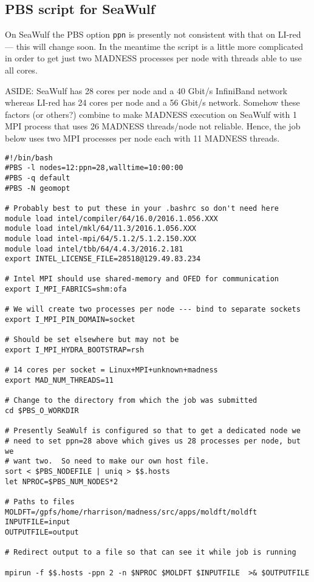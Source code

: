 \documentclass[letterpaper]{book}
\begin{document}
\subsection{PBS script for SeaWulf}

On SeaWulf the PBS option {\tt ppn} is presently not consistent with
that on LI-red --- this will change soon.  In the meantime the script
is a little more complicated in order to get just two MADNESS
processes per node with threads able to use all cores.

ASIDE: SeaWulf has 28 cores per node and a 40 Gbit/s InfiniBand
network whereas LI-red has 24 cores per node and a 56 Gbit/s network.
Somehow these factors (or others?) combine to make MADNESS execution
on SeaWulf with 1 MPI process that uses 26 MADNESS threads/node not
reliable.  Hence, the job below uses two MPI processes per node each
with 11 MADNESS threads.

\begin{verbatim}
#!/bin/bash
#PBS -l nodes=12:ppn=28,walltime=10:00:00
#PBS -q default
#PBS -N geomopt

# Probably best to put these in your .bashrc so don't need here
module load intel/compiler/64/16.0/2016.1.056.XXX
module load intel/mkl/64/11.3/2016.1.056.XXX
module load intel-mpi/64/5.1.2/5.1.2.150.XXX
module load intel/tbb/64/4.4.3/2016.2.181
export INTEL_LICENSE_FILE=28518@129.49.83.234

# Intel MPI should use shared-memory and OFED for communication
export I_MPI_FABRICS=shm:ofa

# We will create two processes per node --- bind to separate sockets
export I_MPI_PIN_DOMAIN=socket

# Should be set elsewhere but may not be
export I_MPI_HYDRA_BOOTSTRAP=rsh

# 14 cores per socket = Linux+MPI+unknown+madness
export MAD_NUM_THREADS=11

# Change to the directory from which the job was submitted
cd $PBS_O_WORKDIR

# Presently SeaWulf is configured so that to get a dedicated node we
# need to set ppn=28 above which gives us 28 processes per node, but we
# want two.  So need to make our own host file.
sort < $PBS_NODEFILE | uniq > $$.hosts
let NPROC=$PBS_NUM_NODES*2

# Paths to files
MOLDFT=/gpfs/home/rharrison/madness/src/apps/moldft/moldft
INPUTFILE=input
OUTPUTFILE=output

# Redirect output to a file so that can see it while job is running

mpirun -f $$.hosts -ppn 2 -n $NPROC $MOLDFT $INPUTFILE  >& $OUTPUTFILE
  
\end{verbatim}
\end{document}
